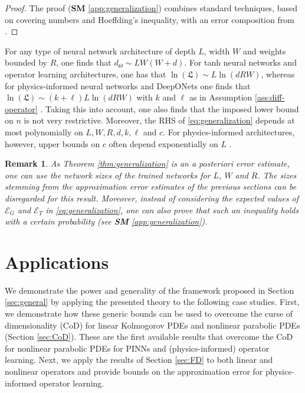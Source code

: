 \documentclass{article}
\numberwithin{equation}{section}
\newcommand{\1}{\mathbbm{1}}
\newcommand{\Et}{\mathcal{E}_T} %
\newcommand{\Eg}{\mathcal{E}_G} %
\newtheorem{remark}[theorem]{Remark}
\begin{document}
\begin{proof}
The proof (\textbf{SM} \ref{app:generalization}) combines standard techniques, based on covering numbers and Hoeffding's inequality, with an error composition from \cite{deryck2021pinn}. 
\end{proof}

For any type of neural network architecture of depth $L$, width $W$ and weights bounded by $R$, one finds that $d_\Theta \sim LW(W+d)$. For tanh neural networks and operator learning architectures, one has that $\ln(\mathfrak{L}) \sim L\ln(dRW)$, whereas for physics-informed neural networks and DeepONets one finds that $\ln(\mathfrak{L}) \sim (k+\ell)L\ln(dRW)$ with $k$ and $\ell$ as in Assumption \ref{ass:diff-operator} \cite{LMK1, deryck2021pinn}. Taking this into account, one also finds that the imposed lower bound on $n$ is not very restrictive. Moreover, the RHS of \eqref{eq:generalization} depends at most polynomially on $L, W, R, d, k, \ell$ and $c$. For physics-informed architectures, however, upper bounds on $c$ often depend exponentially on $L$ \cite{deryck2021pinn, deryck2021navierstokes}. 

\begin{remark}
As Theorem \ref{thm:generalization} is an a posteriori error estimate, one can use the network sizes of the trained networks for $L$, $W$ and $R$. The sizes stemming from the approximation error estimates of the previous sections can be disregarded for this result. Moreover, instead of considering the expected values of $\Eg$ and $\Et$ in \eqref{eq:generalization}, one can also prove that such an inequality holds with a certain probability (see \textbf{SM} \ref{app:generalization}). 
\end{remark}



\section{Applications}\label{sec:applications}

We demonstrate the power and generality of the framework proposed in Section \ref{sec:general} by applying the presented theory to the following case studies. First, we demonstrate how these generic bounds can be used to overcome the curse of dimensionality (CoD) for linear Kolmogorov PDEs and nonlinear parabolic PDEs (Section \ref{sec:CoD}). These are the first available results that overcome the CoD for nonlinear parabolic PDEs for PINNs and (physics-informed) operator learning. Next, we apply the results of Section \ref{sec:FD} to both linear and nonlinear operators and provide bounds on the approximation error for physics-informed operator learning. 
\end{document}
